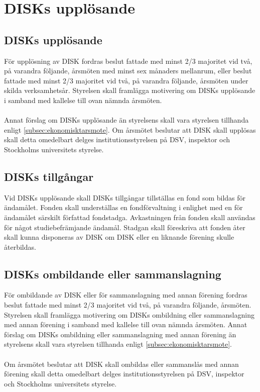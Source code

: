 \clearpage
\section{DISKs upplösande}
\label{sec:disksupplosande}

	\subsection{DISKs upplösande}
	\label{subsec:studentkarensupplosande}
		För upplösning av DISK fordras beslut fattade med minst 2/3 majoritet vid två, på varandra följande, årsmöten med minst sex månaders mellanrum, eller beslut fattade med minst 2/3 majoritet vid två, på varandra följande, årsmöten under skilda verksamhetsår. Styrelsen skall framlägga motivering om DISKs upplösande i samband med kallelse till ovan nämnda årsmöten.\\ \\
		Annat förslag om DISKs upplösande än styrelsens skall vara styrelsen tillhanda enligt \ref{subsec:ekonomisktarsmote}. Om årsmötet beslutar att DISK skall upplösas skall detta omedelbart delges institutionsstyrelsen på DSV, inspektor och Stockholms universitets styrelse.

	\subsection{DISKs tillgångar}
	\label{subsec:diskstillgangar}
		Vid DISKs upplösande skall DISKs tillgångar tillställas en fond som bildas för ändamålet. Fonden skall underställas en fondförvaltning i enlighet med en för ändamålet särskilt författad fondstadga. Avkastningen från fonden skall användas för något studiebefrämjande ändamål. Stadgan skall föreskriva att fonden åter skall kunna disponeras av DISK om DISK eller en liknande förening skulle återbildas.

	\subsection{DISKs ombildande eller sammanslagning}
	\label{subsec:disksombildandeellersammanslagning}
		För ombildande av DISK eller för sammanslagning med annan förening fordras beslut fattade med minst 2/3 majoritet vid två, på varandra följande, årsmöten. Styrelsen skall framlägga motivering om DISKs ombildning eller sammanslagning med annan förening i samband med kallelse till ovan nämnda årsmöten. Annat förslag om DISKs ombildning eller sammanslagning med annan förening än styrelsens skall vara styrelsen tillhanda enligt \ref{subsec:ekonomisktarsmote}.\\ \\
		Om årsmötet beslutar att DISK skall ombildas eller sammanslås med annan förening skall detta omedelbart delges institutionsstyrelsen på DSV, inspektor och Stockholms universitets styrelse.
